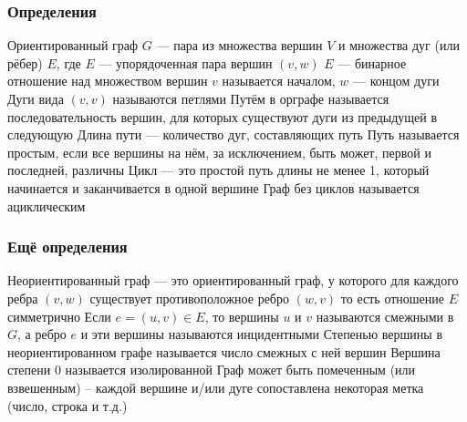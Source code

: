 \documentclass{../../slides-style}
\begin{document}
    \begin{frame}
        \frametitle{Определения}
        \begin{outline}
            \1 Ориентированный граф $G$ --- пара из множества вершин $V$ и множества дуг (или рёбер) $E$, где $E$ --- упорядоченная пара вершин $(v, w)$
                \2 $E$ --- бинарное отношение над множеством вершин
                \2 $v$ называется началом, $w$ --- концом дуги
                \2 Дуги вида $(v, v)$ называются петлями
            \1 Путём в орграфе называется последовательность вершин, для которых существуют дуги из предыдущей в следующую
                \2 Длина пути --- количество дуг, составляющих путь
                \2 Путь называется простым, если все вершины на нём, за исключением, быть может, первой и последней, различны
                \2 Цикл --- это простой путь длины не менее 1, который начинается и заканчивается в одной вершине
                \2 Граф без циклов называется ациклическим
        \end{outline}
    \end{frame}

    \begin{frame}
        \frametitle{Ещё определения}
        \begin{outline}
            \1 Неориентированный граф --- это ориентированный граф, у которого для каждого ребра $(v, w)$ существует противоположное ребро $(w, v)$
                \2 то есть отношение $E$ симметрично
            \1 Если $e = (u,v) \in E$, то вершины $u$ и $v$ называются смежными в $G$, а ребро $e$ и эти вершины называются инцидентными
            \1 Степенью вершины в неориентированном графе называется число смежных с ней вершин
                \2 Вершина степени 0 называется изолированной
            \1 Граф может быть помеченным (или взвешенным) – каждой вершине и/или дуге сопоставлена некоторая метка (число, строка и т.д.)
        \end{outline}
    \end{frame}
\end{document}
